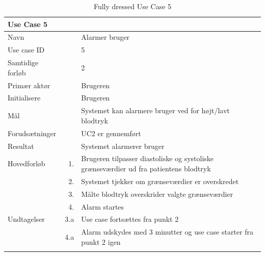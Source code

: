 \begin{longtabu} to  %
    {\large \textbf{Use Case 5}} && \\
    \toprule
    Navn &&    Alarmer bruger\\
    Use case ID &&    5\\
    Samtidige forløb &&    2\\
    Primær aktør &&    Brugeren\\
    Initialisere &&   Brugeren\\
    Mål && Systemet kan alarmere bruger ved for højt/lavt blodtryk\\
    Forudsætninger && UC2 er gennemført\\
    Resultat &&    Systemet alarmerer bruger                    \\ \midrule
    Hovedforløb &    1. &    Brugeren tilpasser diastoliske og systoliske grænseværdier ud fra patientens blodtryk\\ 
    			& 	 2. & 	Systemet tjekker om grænseværdier er overskredet\\ 
    			&	 3. & 	Målte blodtryk overskrider valgte grænseværdier\\ 
    			& 	 4. & 	Alarm startes \\ \midrule            
    Undtagelser &    3.a & Use case fortsættes fra punkt 2 \\ 
    			&	 4.a & Alarm udskydes med 3 minutter og use case starter fra punkt 2 igen\\ \bottomrule
\caption{Fully dressed Use Case 5}
\label{UC5}
\end{longtabu}


